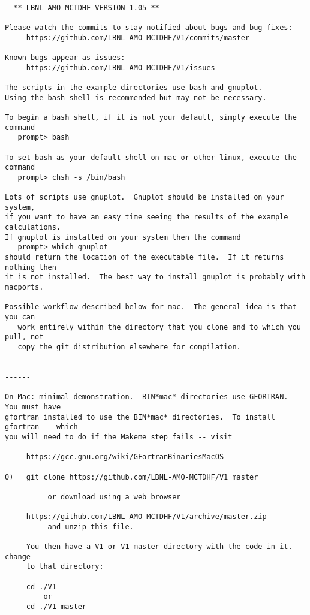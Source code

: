 \begin{verbatim}

  ** LBNL-AMO-MCTDHF VERSION 1.05 **

Please watch the commits to stay notified about bugs and bug fixes:
     https://github.com/LBNL-AMO-MCTDHF/V1/commits/master

Known bugs appear as issues:
     https://github.com/LBNL-AMO-MCTDHF/V1/issues

The scripts in the example directories use bash and gnuplot.  
Using the bash shell is recommended but may not be necessary.

To begin a bash shell, if it is not your default, simply execute the command
   prompt> bash

To set bash as your default shell on mac or other linux, execute the command
   prompt> chsh -s /bin/bash

Lots of scripts use gnuplot.  Gnuplot should be installed on your system,
if you want to have an easy time seeing the results of the example calculations.
If gnuplot is installed on your system then the command
   prompt> which gnuplot
should return the location of the executable file.  If it returns nothing then
it is not installed.  The best way to install gnuplot is probably with macports.

Possible workflow described below for mac.  The general idea is that you can 
   work entirely within the directory that you clone and to which you pull, not 
   copy the git distribution elsewhere for compilation.

----------------------------------------------------------------------------

On Mac: minimal demonstration.  BIN*mac* directories use GFORTRAN.  You must have
gfortran installed to use the BIN*mac* directories.  To install gfortran -- which
you will need to do if the Makeme step fails -- visit 

     https://gcc.gnu.org/wiki/GFortranBinariesMacOS

0)   git clone https://github.com/LBNL-AMO-MCTDHF/V1 master

          or download using a web browser

     https://github.com/LBNL-AMO-MCTDHF/V1/archive/master.zip
          and unzip this file.

     You then have a V1 or V1-master directory with the code in it.  change
     to that directory:

     cd ./V1
         or
     cd ./V1-master


\end{verbatim}
